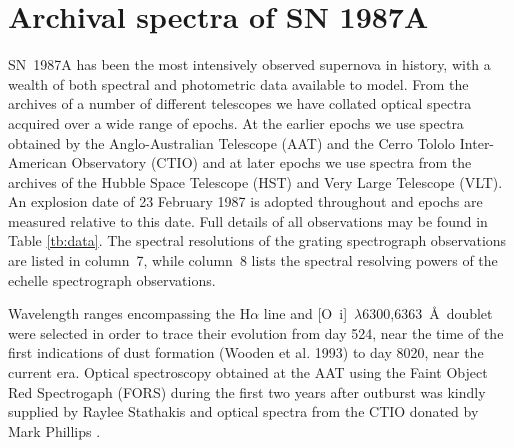 \documentclass[useAMS,usenatbib,usegraphicx]{mnras}
\begin{document}

\section{Archival spectra of SN 1987A}
\label{spectra}

SN~1987A has been the most intensively observed supernova in history, with 
a wealth of both spectral and photometric data available to model.  From 
the archives of a number of different telescopes we have collated optical 
spectra acquired over a wide range of epochs.  At the earlier epochs we 
use spectra obtained by the Anglo-Australian Telescope (AAT) and the Cerro 
Tololo Inter-American Observatory (CTIO) and at later epochs we 
use spectra from the archives of the Hubble Space Telescope (HST) and Very 
Large Telescope (VLT).  An explosion date of 23 February 1987 is adopted 
throughout and epochs are measured relative to this date.  Full details of 
all observations may be found in Table \ref{tb:data}. The spectral 
resolutions of the grating spectrograph observations are listed in 
column~7, while column~8 lists the spectral resolving powers of the 
echelle spectrograph observations.

Wavelength ranges encompassing the H$\alpha$ line and [O~{\sc i}]~$\lambda$6300,6363~\AA\ doublet were selected in order to trace their 
evolution from day 524, near the time of the first indications of dust 
formation (Wooden et al. 1993) to day 8020, near the current era. Optical 
spectroscopy obtained at the AAT using the Faint Object Red Spectrogaph 
(FORS) during the first two years after outburst was kindly supplied by Raylee 
Stathakis \citep{Spyromilio1991, Spyromilio1993, Hanuschik1993} and optical spectra from the CTIO donated by Mark Phillips \citep{Suntzeff1991}.
\end{document}
